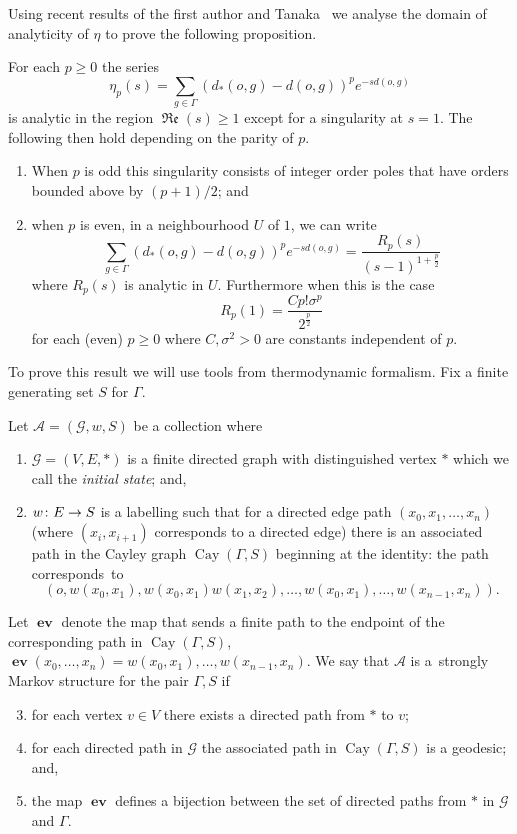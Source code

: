 \documentclass[AHL,Unicode,longabstracts,published]{cedram}
\newcommand{\G}{\Gamma}
\newcommand{\Ac}{\mathcal{A}}
\newcommand{\Gc}{\mathcal{G}}
\DeclareMathOperator{\fkRe}{\mathfrak{Re}}
\DeclareMathOperator{\Cay}{Cay}
\DeclareMathOperator{\ev}{\mathbf{ev}}
\renewcommand*{\to}{\mathchoice{\longrightarrow}{\rightarrow}{\rightarrow}{\rightarrow}}
\newcounter{setofcase}
\newcounter{case}[setofcase]
\theoremstyle{plain}
\newcommand{\G}{\Gamma}
\begin{document}
Using recent results of the first author and Tanaka~\cite{cantrell,cantrell.tanaka.2} we analyse the domain of analyticity of $\eta$ to prove the following proposition.

\begin{prop}\label{prop.analytic}
For each $p \ge 0$ the series
\[
\eta_p(s) = \sum_{g\in\G} (d_\ast(o,g) - d(o,g))^p e^{-sd(o,g)}
\]
is analytic in the region $\fkRe(s) \ge 1$ except for a singularity at $s = 1$. The following then hold depending on the parity of $p$.
\begin{enumerate}
\item\label{prop2.9.1} When $p$ is odd this singularity consists of integer order poles that have orders bounded above by $(p+1)/2$; and
\item\label{prop2.9.2} when $p$ is even, in a neighbourhood $U$ of $1$, we can write
\[
\sum_{g\in\G} (d_\ast(o,g) - d(o,g))^p e^{-sd(o,g)} = \frac{R_p(s)}{(s-1)^{1 + \frac{p}{2}}}
\]
where $R_p(s)$ is analytic in $U$. Furthermore when this is the case
\[
R_p(1) = \frac{C p! \sigma^p}{2^{\frac{p}{2}}}
\]
for each (even) $ p \ge 0$ where $C, \sigma^2 >0$ are constants independent of $p$.
\end{enumerate}
\end{prop}

To prove this result we will use tools from thermodynamic formalism. Fix a finite generating set $S$ for $\G$.

\begin{defi}\label{def.sms}
Let $\Ac=(\Gc, w, S)$ be a collection where
\begin{enumerate}
\item\label{defi2.10.1} $\Gc=(V, E, \ast)$ is a finite directed graph with distinguished vertex $\ast$ which we call the \emph{initial state}; and,
\item\label{defi2.10.2} $w\colon E \to S$ is a labelling such that for a directed edge path $(x_0, x_1, \dots, x_{n})$ (where $(x_i, x_{i+1})$ corresponds to a directed edge) there is an associated path in the Cayley graph $\Cay(\G, S)$ beginning at the identity: the path corres\-ponds~to
\[
(o, w(x_0,x_1), w(x_0,x_1)w(x_1,x_2), \dots, w(x_0,x_1),\dots, w(x_{n-1}, x_n)).
\]
\end{enumerate}
Let $\ev$ denote the map that sends a finite path to the endpoint of the corresponding path in $\Cay(\G,S)$, $\ev(x_0,\dots, x_n) = w(x_0,x_1), \dots, w(x_{n-1},x_n)$. We say that $\Ac$ is a~strongly Markov structure for the pair $\G, S$ if
\begin{enumerate}
\setcounter{enumi}{2}
\item\label{defi2.10.3} for each vertex $v\in V$ there exists a directed path from $\ast$ to $v$;
\item\label{defi2.10.4} for each directed path in $\Gc$ the associated path in $\Cay(\G, S)$ is a geodesic; and,
\item\label{defi2.10.5} the map $\ev$ defines a bijection between the set of directed paths from $\ast$ in $\Gc$ and $\G$.
\end{enumerate}
\end{defi}
\end{document}
